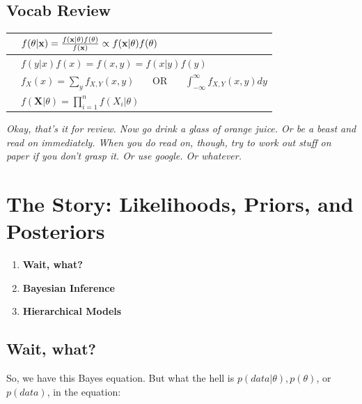 \documentclass[12pt]{book}
\newcommand{\rr}{\raggedright}
\newcommand{\tn}{\tabularnewline}
\begin{document}
\section{Vocab Review}

{\renewcommand{\arraystretch}{3}
\begin{tabular}{|c|p{10cm}|}
\hline

{\color{red}{Bayes Theorem}} & \rr $f(\theta|\textbf{x}) = \frac{f(\textbf{\textbf{x}}|\theta)f(\theta)}{f(\textbf{x})} \propto f(\textbf{x}|\theta)f(\theta)$ \tn
	 \hline
{\color{red}{Conditional Probability}} & $f(y|x)f(x) = f(x,y) = f(x|y)f(y) $
	\\ \hline
{\color{red}{Marginal Probability}} & $f_X(x) = \sum_{y}f_{X,Y}(x,y)$ \ \ \ OR \ \ \ $\int_{-\infty}^{\infty} f_{X,Y}(x,y) dy$
	 \\ \hline
{\color{red}{Likelihood Function}} & $f(\textbf{X}|\theta) = \prod_{i=1}^n{f(X_i |\theta)}$
	 \\ \hline
\end{tabular} }



\vspace{60mm}

\begin{center}
\textit{Okay, that's it for review. Now go drink a glass of orange juice. Or be a beast and read on immediately. When you do read on, though, try to work out stuff on paper if you don't grasp it. Or use google. Or whatever.}
\end{center}






\chapter{The Story: Likelihoods, Priors, and Posteriors}
\begin{enumerate}
\item \textbf{Wait, what?}
\item \textbf{Bayesian Inference}
\item \textbf{Hierarchical Models}
\end{enumerate}

\vspace{10 mm}

\section{Wait, what?}
So, we have this Bayes equation. But what the hell is $p(data|\theta),  p(\theta)$, or $p(data)$, in the equation:
\end{document}
